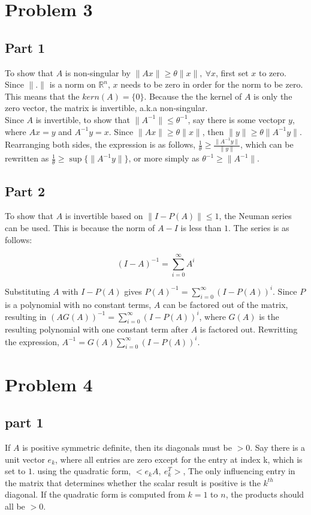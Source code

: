 \documentclass{report}
\begin{document}
\section*{Problem 3}
\subsection*{Part 1}
To show that $A$ is non-singular by $\|Ax\| \geq \theta \|x\|, \ \forall x$, first set $x$ to zero. Since $\|.\|$ is a norm on $\mathbb{R}^n$,
$x$ needs to be zero in order for the norm to be zero. This means that the $kern(A)=\{0\}$. Because the the kernel of $A$
is only the zero vector, the matrix is invertible, a.k.a non-singular. \\

\noindent Since $A$ is invertible, to show that $\|A^{-1}\|\leq \theta^{-1}$, say there is some vectopr $y$, where $Ax=y$ and $A^{-1}y=x$.
Since $\|Ax\| \geq \theta\|x\|$, then $\|y\| \geq \theta \|A^{-1}y\|$. Rearranging both sides, the expression is as follows, 
$\frac{1}{\theta} \geq \frac{\|A^{-1}y\|}{\|y\|}$, which can be rewritten as $\frac{1}{\theta} \geq \sup\{\|A^{-1}y\|\}$, or more simply as
$\theta^{-1} \geq \|A^{-1}\|$.

\subsection*{Part 2}
To show that $A$ is invertible based on $\|I-P(A)\|\leq1$, the Neuman series can be used. This is because the norm of $A-I$ is less than $1$. The series is as follows:

$$(I-A)^{-1} = \sum\limits_{i=0}^{\infty} A^i$$

\noindent Substituting $A$ with $I-P(A)$ gives $P(A)^{-1}=\sum\limits_{i=0}^{\infty}(I-P(A))^i$. Since $P$ is a polynomial with no constant terms,
$A$ can be factored out of the matrix, resulting in $(AG(A))^{-1} = \sum\limits_{i=0}^{\infty} (I-P(A))^i$, where $G(A)$ is the resulting polynomial 
with one constant term after $A$ is factored out. Rewritting the expression, $A^{-1} = G(A)\sum\limits_{i=0}^{\infty}(I-P(A))^i$.

\section*{Problem 4}
\subsection*{part 1}
If $A$ is positive symmetric definite, then its diagonals must be $>0$. Say there is a unit vector $e_k$, where all entries are zero except for the entry at 
index k, which is set to $1$. using the quadratic form, $<e_kA,\ e_k^T>$, The only influencing entry in the matrix that determines whether the scalar result is positive is
the $k^{th}$ diagonal. If the quadratic form is computed from $k=1$ to $n$, the products should all be $>0$.
\end{document}
